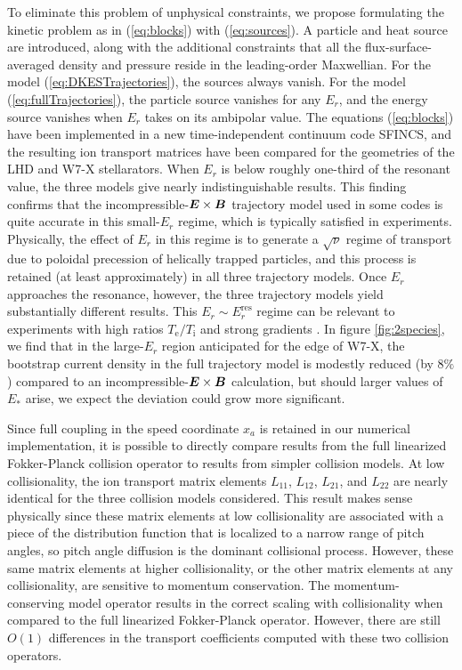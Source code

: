 \documentclass[12pt,superscriptaddress]{revtex4}
\newcommand{\vect}[1]{\mbox{\boldmath $#1$}}
\newcommand{\Ti}{T_{\mathrm{i}}}
\newcommand{\Te}{T_{\mathrm{e}}}
\newcommand{\Erres}{E_r^{\mathrm{res}}}
\begin{document}
To eliminate this problem of unphysical constraints,
we propose formulating the kinetic problem as in  (\ref{eq:blocks}) with (\ref{eq:sources}).
A particle and heat source are introduced,
along with the additional constraints that all the flux-surface-averaged
density and pressure reside in the leading-order Maxwellian.
For the model (\ref{eq:DKESTrajectories}), the sources always vanish.
For the model  (\ref{eq:fullTrajectories}), the particle source
vanishes for any $E_r$, and the energy source vanishes when $E_r$
takes on its ambipolar value.
The equations (\ref{eq:blocks}) have been implemented in a new time-independent continuum code SFINCS,
and the resulting ion transport matrices have been compared for the geometries of the LHD and W7-X stellarators.
When $E_r$ is below roughly one-third of the resonant value,
the three models give nearly indistinguishable results. 
This finding confirms that the incompressible-$\vect{E}\times\vect{B}$ trajectory
model used in some codes \cite{DKES1,DKES2} is quite accurate in this
small-$E_r$ regime, which is typically satisfied in experiments.
Physically, the effect of $E_r$ in this regime is to generate a $\sqrt{\nu}$ regime
of transport due to poloidal precession of helically trapped particles,
and this process is retained (at least approximately) in all three trajectory models.
Once $E_r$ approaches the resonance, however, the three trajectory models
yield substantially different results.
This $E_r \sim \Erres$ regime can be relevant to experiments with high ratios $\Te / \Ti$
\cite{Lore, Briesemeister} and strong gradients \cite{Baldzuhn}.
In figure \ref{fig:2species}, we find that in the large-$E_r$ region anticipated for the edge of W7-X,
the bootstrap current density in the full trajectory model is modestly reduced (by $8\%$)
compared to an incompressible-$\vect{E}\times\vect{B}$ calculation,
but should larger values of $E_*$ arise, we expect the deviation could grow more significant.

Since full coupling in the speed coordinate $x_{a}$ is retained in our numerical
implementation, it is possible to directly compare results from the full linearized
Fokker-Planck collision operator to results from simpler collision models.
At low collisionality, the ion transport matrix elements $L_{11}$,
$L_{12}$, $L_{21}$, and $L_{22}$ are nearly identical for the three collision models
considered. This result makes sense physically since these matrix elements at low collisionality
are associated with a piece of the distribution function that is localized to a narrow range of pitch angles,
so pitch angle diffusion is the dominant collisional process.
However, these same matrix elements at higher collisionality, or the other matrix elements
at any collisionality, are sensitive to momentum conservation.
The momentum-conserving model operator results in the correct scaling with collisionality
when compared to the full linearized Fokker-Planck operator.
However, there are still $O(1)$ differences in the transport coefficients
computed with these two collision operators.
\end{document}
